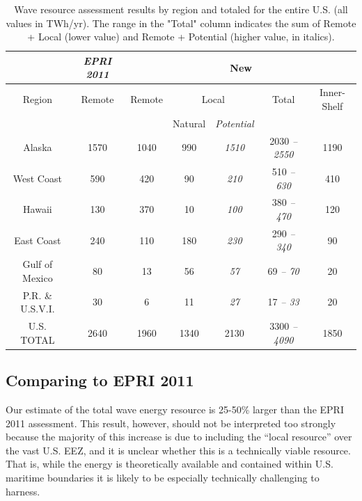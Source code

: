 \begin{table}[ht]
  \centering
  \begin{tabular}{|c|c|c|c|c|c|c|}
    \cline{2-7}
    \multicolumn{1}{c|}{} & {\it EPRI 2011} & \multicolumn{5}{c|}{New} \\
    \hline
    Region & Remote  & Remote & \multicolumn{2}{c|}{Local} & Total & Inner-Shelf\\
    & & & Natural & {\it Potential} & & \\
    \hline
    Alaska & 1570 & 1040 & 990 & {\it 1510} & 2030 {\it – 2550} & 1190 \\
    West Coast & 590 & 420 & 90 & {\it 210} & 510 {\it – 630} & 410 \\
    Hawaii & 130 & 370 & 10 & {\it 100} & 380 {\it – 470} & 120 \\
    East Coast & 240 & 110 & 180 & {\it 230} & 290 {\it – 340} & 90 \\
    Gulf of Mexico & 80 & 13 & 56 & {\it 57} & 69 {\it – 70} & 20 \\
    P.R. \& U.S.V.I. & 30 & 6 & 11 & {\it 27} & 17 {\it – 33} & 20 \\
    \hline \hline
U.S. TOTAL & 2640 & 1960 & 1340 & 2130 & 3300 {\it – 4090} & 1850 \\
\hline
  \end{tabular}
  \caption{Wave resource assessment results by region and totaled for the entire U.S. (all values in TWh/yr). The range in the "Total" column indicates the sum of Remote + Local (lower value) and Remote + Potential (higher value, in italics).
  }
  \label{table:totals}
\end{table}

\subsection{Comparing to EPRI 2011}

Our estimate of the total wave energy resource is 25-50\% larger than the EPRI 2011 assessment. This result, however, should not be interpreted too strongly because the majority of this increase is due to including the ``local resource'' over the vast U.S. EEZ, and it is unclear whether this is a technically viable resource. That is, while the energy is theoretically available and contained within U.S. maritime boundaries it is likely to be especially technically challenging to harness.

